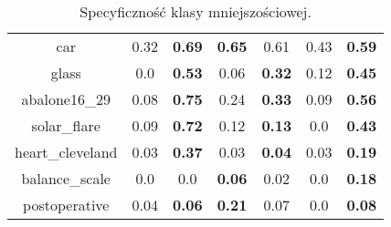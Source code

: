 \begin{table}[H]
\begin{center}
{\begin{tabular}{c|cccccc}
			car&0.32&\textbf{0.69}&\textbf{0.65}&0.61&0.43&\textbf{0.59}\\%
			glass&0.0&\textbf{0.53}&0.06&\textbf{0.32}&0.12&\textbf{0.45}\\%
			abalone16\_29&0.08&\textbf{0.75}&0.24&\textbf{0.33}&0.09&\textbf{0.56}\\%
			solar\_flare&0.09&\textbf{0.72}&0.12&\textbf{0.13}&0.0&\textbf{0.43}\\%
			heart\_cleveland&0.03&\textbf{0.37}&0.03&\textbf{0.04}&0.03&\textbf{0.19}\\%
			balance\_scale&0.0&0.0&\textbf{0.06}&0.02&0.0&\textbf{0.18}\\%
			postoperative&0.04&\textbf{0.06}&\textbf{0.21}&0.07&0.0&\textbf{0.08}\\%
			\end{tabular}}
			\caption{Specyficzność klasy mniejszościowej.}
			\label{specsmoteen}
		\end{center}
	\end{table}
